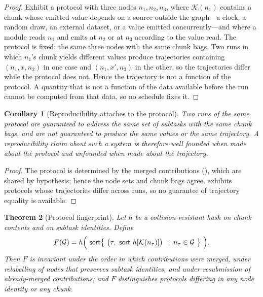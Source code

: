 \documentclass[11pt,a4paper]{article}
\theoremstyle{thmstyle}
\newtheorem{theorem}{Theorem}[section]
\newtheorem{corollary}[theorem]{Corollary}
\theoremstyle{definition}
\theoremstyle{remark}
\newcommand{\Node}{n}
\newcommand{\Chunks}{\mathcal{K}}
\newcommand{\Graph}{\mathcal{G}}
\begin{document}
\begin{proof}
Exhibit a protocol with three nodes $\Node_1,\Node_2,\Node_3$, where
$\Chunks(\Node_1)$ contains a chunk whose emitted value depends on a source
outside the graph---a clock, a random draw, an external dataset, or a value
emitted concurrently---and where a module reads $\Node_1$ and emits at
$\Node_2$ or at $\Node_3$ according to the value read. The protocol is fixed:
the same three nodes with the same chunk bags. Two runs in which
$\Node_1$'s chunk yields different values produce trajectories containing
$(\Node_1,x,\Node_2)$ in one case and $(\Node_1,x',\Node_3)$ in the other,
so the trajectories differ while the protocol does not. Hence the trajectory
is not a function of the protocol. A quantity that is not a function of the
data available before the run cannot be computed from that data, so no
schedule fixes it.
\end{proof}

\begin{corollary}[Reproducibility attaches to the protocol]
\label{cor:repro}
Two runs of the same protocol are guaranteed to address the same set of
subtasks with the same chunk bags, and are not guaranteed to produce the
same values or the same trajectory. A reproducibility claim about such a
system is therefore well founded when made about the protocol and unfounded
when made about the trajectory.
\end{corollary}

\begin{proof}
The protocol is determined by the merged contributions
(), which are shared by hypothesis; hence the node sets
and chunk bags agree.  exhibits protocols whose
trajectories differ across runs, so no guarantee of trajectory equality is
available.
\end{proof}

\begin{theorem}[Protocol fingerprint]
\label{thm:fingerprint}
Let $h$ be a collision-resistant hash on chunk contents and on subtask
identities. Define
\[
F(\Graph)=h\Bigl(\ \mathsf{sort}\bigl\{\ \bigl(\tau,\ \mathsf{sort}\ h[\Chunks(\Node_\tau)]\bigr)\ :\ \Node_\tau\in\Graph\ \bigr\}\ \Bigr).
\]
Then $F$ is invariant under the order in which contributions were merged,
under relabelling of nodes that preserves subtask identities, and under
resubmission of already-merged contributions; and $F$ distinguishes
protocols differing in any node identity or any chunk.
\end{theorem}
\end{document}
